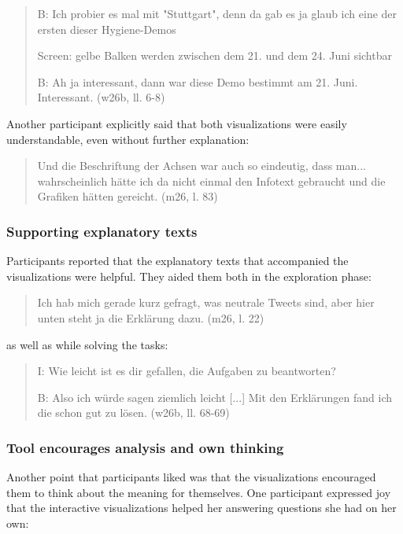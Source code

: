 \begin{quote}
    B: Ich probier es mal mit "Stuttgart", denn da gab es ja glaub ich eine der ersten dieser Hygiene-Demos
    
    Screen: gelbe Balken werden zwischen dem 21. und dem 24. Juni sichtbar
    
    B: Ah ja interessant, dann war diese Demo bestimmt am 21. Juni. Interessant. (w26b, ll. 6-8)
\end{quote}

Another participant explicitly said that both visualizations were easily understandable, even without further explanation:

\begin{quote}
    Und die Beschriftung der Achsen war auch so eindeutig, dass man... wahrscheinlich hätte ich da nicht einmal den Infotext gebraucht und die Grafiken hätten gereicht. (m26, l. 83)
\end{quote}

\subsubsection*{Supporting explanatory texts}
Participants reported that the explanatory texts that accompanied the visualizations were helpful. They aided them both in the exploration phase:

\begin{quote}
    Ich hab mich gerade kurz gefragt, was neutrale Tweets sind, aber hier unten steht ja die Erklärung dazu. (m26, l. 22)
\end{quote}

as well as while solving the tasks:

\begin{quote}
    I: Wie leicht ist es dir gefallen, die Aufgaben zu beantworten?

    B: Also ich würde sagen ziemlich leicht [...] Mit den Erklärungen fand ich die schon gut zu lösen. (w26b, ll. 68-69)
\end{quote}

\subsubsection*{Tool encourages analysis and own thinking}
Another point that participants liked was that the visualizations encouraged them to think about the meaning for themselves. One participant expressed joy that the interactive visualizations helped her answering questions she had on her own:

